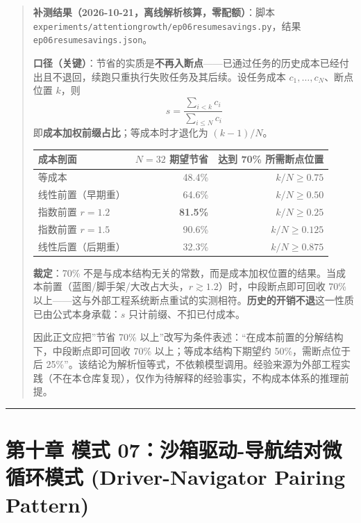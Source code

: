 \documentclass[
]{ctexart}
\renewcommand{\_}{\discretionary{}{}{\textunderscore}}
\let\oldsection\section
\renewcommand{\section}{\clearpage\oldsection}
\begin{document}
\begin{quote}
\textbf{补测结果（2026-10-21，离线解析核算，零配额）}：脚本
\texttt{experiments/attention\_growth/e\_p06\_resume\_savings.py}，结果
\texttt{e\_p06\_resume\_savings.json}。

\textbf{口径（关键）}：节省的实质是\textbf{不再入断点}------已通过任务的历史成本已经付出且不退回，续跑只重执行失败任务及其后续。设任务成本
\(c_1,\dots,c_N\)、断点位置 \(k\)，则
\[s=\frac{\sum_{i<k}c_i}{\sum_{i\le N}c_i}\]
即\textbf{成本加权前缀占比}；等成本时才退化为 \((k-1)/N\)。

{\def\LTcaptype{} %
\begin{longtable}[]{@{}lrr@{}}
\toprule\noalign{}
成本剖面 & \(N=32\) 期望节省 & 达到 70\% 所需断点位置 \\
\midrule\noalign{}
\endhead
\bottomrule\noalign{}
\endlastfoot
等成本 & 48.4\% & \(k/N\ge0.75\) \\
线性前置（早期重） & 64.6\% & \(k/N\ge0.50\) \\
指数前置 \(r=1.2\) & \textbf{81.5\%} & \(k/N\ge0.25\) \\
指数前置 \(r=1.5\) & 90.6\% & \(k/N\ge0.125\) \\
线性后置（后期重） & 32.3\% & \(k/N\ge0.875\) \\
\end{longtable}
}

\textbf{裁定}：70\%
不是与成本结构无关的常数，而是成本加权位置的结果。当成本前置（蓝图/脚手架/大改占大头，\(r\gtrsim1.2\)）时，中段断点即可回收
70\%
以上------这与外部工程系统断点重试的实测相符。\textbf{历史的开销不退}这一性质已由公式本身承载：\(s\)
只计前缀、不扣已付成本。

因此正文应把''节省 70\%
以上''改写为条件表述：``在成本前置的分解结构下，中段断点即可回收 70\%
以上；等成本结构下期望约 50\%，需断点位于后
25\%''。该结论为解析恒等式，不依赖模型调用。经验来源为外部工程实践（不在本仓库复现），仅作为待解释的经验事实，不构成本体系的推理前提。
\end{quote}

\begin{center}\rule{0.5\linewidth}{0.5pt}\end{center}

\section{第十章 模式 07：沙箱驱动-导航结对微循环模式 (Driver-Navigator Pairing
Pattern)}\label{ux6a21ux5f0f-07ux6c99ux7bb1ux9a71ux52a8-ux5bfcux822aux7ed3ux5bf9ux5faeux5faaux73afux6a21ux5f0f-driver-navigator-pairing-pattern}
\end{document}
